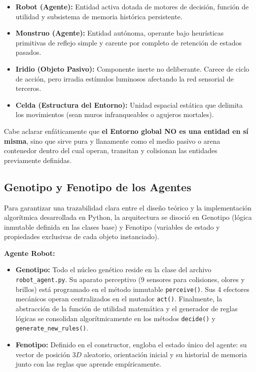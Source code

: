 \documentclass[conference]{IEEEtran}
\begin{document}
\begin{itemize}
    \item \textbf{Robot (Agente):} Entidad activa dotada de motores de decisión, función de utilidad y subsistema de memoria histórica persistente.
    \item \textbf{Monstruo (Agente):} Entidad autónoma, operante bajo heurísticas primitivas de reflejo simple y carente por completo de retención de estados pasados.
    \item \textbf{Iridio (Objeto Pasivo):} Componente inerte no deliberante. Carece de ciclo de acción, pero irradia estímulos luminosos afectando la red sensorial de terceros.
    \item \textbf{Celda (Estructura del Entorno):} Unidad espacial estática que delimita los movimientos (sean muros infranqueables o agujeros mortales).
\end{itemize}

Cabe aclarar enfáticamente que \textbf{el Entorno global NO es una entidad en sí misma}, sino que sirve pura y llanamente como el medio pasivo o arena contenedor dentro del cual operan, transitan y colisionan las entidades previamente definidas.

\subsection{Genotipo y Fenotipo de los Agentes}
Para garantizar una trazabilidad clara entre el diseño teórico y la implementación algorítmica desarrollada en Python, la arquitectura se disoció en Genotipo (lógica inmutable definida en las clases base) y Fenotipo (variables de estado y propiedades exclusivas de cada objeto instanciado).

\textbf{Agente Robot:}
\begin{itemize}
    \item \textbf{Genotipo:} Todo el núcleo genético reside en la clase del archivo \texttt{robot\_agent.py}. Su aparato perceptivo (9 sensores para colisiones, olores y brillos) está programado en el método inmutable \texttt{perceive()}. Sus 4 efectores mecánicos operan centralizados en el mutador \texttt{act()}. Finalmente, la abstracción de la función de utilidad matemática y el generador de reglas lógicas se consolidan algorítmicamente en los métodos \texttt{decide()} y \texttt{generate\_new\_rules()}.
    \item \textbf{Fenotipo:} Definido en el constructor, engloba el estado único del agente: su vector de posición $3D$ aleatorio, orientación inicial y su historial de memoria junto con las reglas que aprende empíricamente.
\end{itemize}
\end{document}
